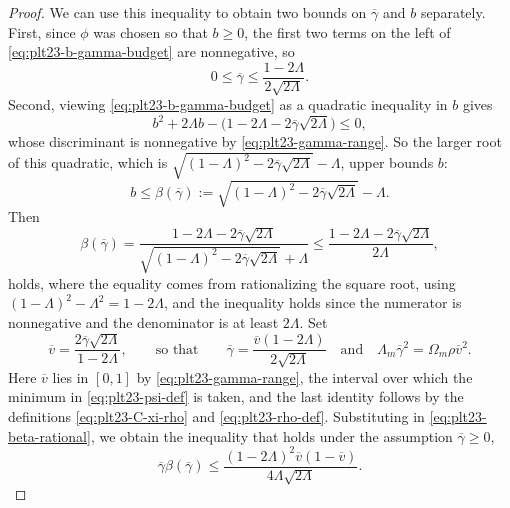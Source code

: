 \documentclass[11pt]{article}
\numberwithin{equation}{section}
\begin{document}
\begin{proof}
  We can use this inequality to obtain two bounds on $\overline\gamma$ and
  $b$ separately.  First, since $\phi$ was chosen so that $b\ge0$, the first
  two terms on the left of
  \eqref{eq:plt23-b-gamma-budget} are nonnegative, so
  \begin{equation}\label{eq:plt23-gamma-range}
    0\le\overline\gamma\le\frac{1-2\Lambda}{2\sqrt{2\Lambda}}.
  \end{equation}
  Second, viewing \eqref{eq:plt23-b-gamma-budget} as a quadratic inequality
  in $b$ gives
  \[
    b^2+2\Lambda b-\bigl(1-2\Lambda-2\overline\gamma\sqrt{2\Lambda}\bigr)\le0,
  \]
  whose discriminant is nonnegative by \eqref{eq:plt23-gamma-range}.  So the
  larger root of this quadratic, which is
  $\sqrt{(1-\Lambda)^2-2\overline\gamma\sqrt{2\Lambda}}-\Lambda$, upper bounds
  $b$:
  \begin{equation}\label{eq:plt23-beta-gamma}
    b\le\beta(\overline\gamma):=
    \sqrt{(1-\Lambda)^2-2\overline\gamma\sqrt{2\Lambda}}-\Lambda.
  \end{equation}
  Then
  \begin{equation}\label{eq:plt23-beta-rational}
    \beta(\overline\gamma)
    =\frac{1-2\Lambda-2\overline\gamma\sqrt{2\Lambda}}
    {\sqrt{(1-\Lambda)^2-2\overline\gamma\sqrt{2\Lambda}}+\Lambda}
    \le\frac{1-2\Lambda-2\overline\gamma\sqrt{2\Lambda}}{2\Lambda},
  \end{equation}
  holds, where the equality comes from rationalizing the square root, using
  $(1-\Lambda)^2-\Lambda^2=1-2\Lambda$, and the inequality holds since the
  numerator is nonnegative and the denominator is at least $2\Lambda$.
  Set
  \begin{equation}\label{eq:plt23-v-def}
    \overline v=\frac{2\overline\gamma\sqrt{2\Lambda}}{1-2\Lambda},
    \qquad\text{so that}\qquad
    \overline\gamma=\frac{\overline v(1-2\Lambda)}{2\sqrt{2\Lambda}}
    \quad\text{and}\quad
    \Lambda_m\overline\gamma^2=\Omega_m\rho\overline v^2.
  \end{equation}
  Here $\overline v$ lies in $[0,1]$ by \eqref{eq:plt23-gamma-range}, the
  interval over which the minimum in \eqref{eq:plt23-psi-def} is taken, and
  the last identity follows by the definitions
  \eqref{eq:plt23-C-xi-rho} and \eqref{eq:plt23-rho-def}.
  Substituting in \eqref{eq:plt23-beta-rational}, we obtain the inequality
  that holds under the assumption $\overline\gamma\ge0$,
  \begin{equation}\label{eq:plt23-gamma-beta-v}
    \overline\gamma\beta(\overline\gamma)
    \le\frac{(1-2\Lambda)^2\overline v(1-\overline v)}{4\Lambda\sqrt{2\Lambda}}.
  \end{equation}


\end{proof}
\end{document}
